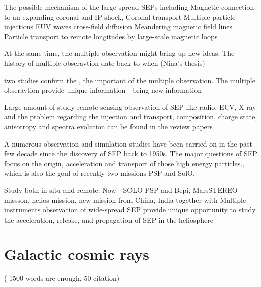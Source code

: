 The possible mechanism of the large spread SEPs including Magnetic connection to an expanding coronal and IP shock,
Coronal transport
Multiple particle injections
EUV waves
cross-field diffusion
Meandering magnetic field lines
Particle transport to remote longitudes by large-scale magnetic loops



At the same time, the multiple observation might bring up new ideas.
The history of multiple obseravtion date back to when  (Nina's thesis)

two studies confirm the , the important of the multiple observation.
The multiple obseravtion provide unique information - bring new information



Large amount of study 
remote-sensing observation of SEP like radio, EUV, X-ray and the problem regarding the injection and transport, composition, charge state, anisotropy and spectra evolution can be found in the review papers \citet{reames2013two, Desai_Diacalone2016LRSP, Reames2021LNP}

A numerous observation and simulation studies have been carried on in the past few decade since the discovery of SEP back to 1950s. The major questions of SEP focus on the origin, acceleration and transport of those high energy particles.\citep{Desai_Diacalone2016LRSP}, which is also the goal of recently two missions \ac{PSP} and \ac{SolO}. 

Study both in-situ and remote.
Now - \ac{SOLO} \ac{PSP} and \ac{Bepi},  MarsSTEREO missson, helios mission, new mission from China, \citet{Wang2020Solarring,}India
together with 
Multiple instruments observation of wide-spread SEP provide unique opportunity to study the acceleration, release, and propagation of SEP in the heliosphere

















\section{Galactic cosmic rays} ( 1500 words are enough, 50 citation)

